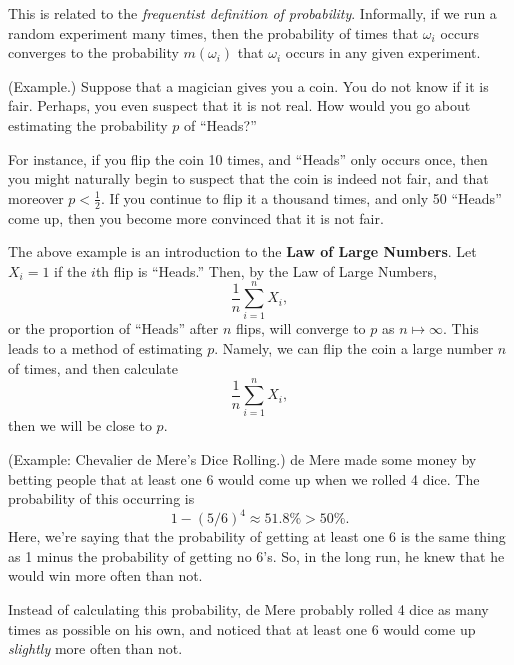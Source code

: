 \documentclass[letterpaper]{article}
\begin{document}
\bigskip 

This is related to the \emph{frequentist definition of probability}. Informally, if we run a random experiment many times, then the probability of times that $\omega_i$ occurs converges to the probability $m(\omega_i)$ that $\omega_i$ occurs in any given experiment.

\begin{mdframed}[]
    (Example.) Suppose that a magician gives you a coin. You do not know if it is fair. Perhaps, you even suspect that it is not real. How would you go about estimating the probability $p$ of ``Heads?''

    \bigskip 

    For instance, if you flip the coin 10 times, and ``Heads'' only occurs once, then you might naturally begin to suspect that the coin is indeed not fair, and that moreover $p < \frac{1}{2}$. If you continue to flip it a thousand times, and only 50 ``Heads'' come up, then you become more convinced that it is not fair. 
\end{mdframed}

The above example is an introduction to the \textbf{Law of Large Numbers}. Let $X_i = 1$ if the $i$th flip is ``Heads.'' Then, by the Law of Large Numbers, 
\[\frac{1}{n} \sum_{i = 1}^n X_i,\]
or the proportion of ``Heads'' after $n$ flips, will converge to $p$ as $n \mapsto \infty$. This leads to a method of estimating $p$. Namely, we can flip the coin a large number $n$ of times, and then calculate 
\[\frac{1}{n} \sum_{i = 1}^n X_i,\]
then we will be close to $p$.

\begin{mdframed}[]
    (Example: Chevalier de Mere's Dice Rolling.) de Mere made some money by betting people that at least one 6 would come up when we rolled 4 dice. The probability of this occurring is 
    \[1 - (5 / 6)^4 \approx 51.8\% > 50\%.\]
    Here, we're saying that the probability of getting at least one 6 is the same thing as 1 minus the probability of getting no 6's. So, in the long run, he knew that he would win more often than not. 

    \bigskip 

    Instead of calculating this probability, de Mere probably rolled 4 dice as many times as possible on his own, and noticed that at least one 6 would come up \emph{slightly} more often than not.
\end{mdframed}
\end{document}
